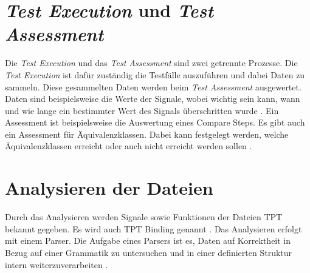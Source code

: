 \section*{\textit{Test Execution} und \textit{Test Assessment}}
Die \textit{Test Execution} und das \textit{Test Assessment} sind zwei getrennte Prozesse.  
Die \textit{Test Execution} ist dafür zuständig die Testfälle auszuführen und dabei Daten zu sammeln. %
Diese gesammelten Daten werden beim \textit{Test Assessment} ausgewertet. 
Daten sind beispielsweise die Werte der Signale, wobei wichtig sein kann, wann und wie lange ein  bestimmter Wert des Signals überschritten wurde \cite[vgl.][S. 1212 ff.]{userguide}.
Ein Assessment ist beispielsweise die Auswertung eines Compare Steps.
Es gibt auch ein Assessment für Äquivalenzklassen. Dabei kann festgelegt werden, welche Äquivalenzklassen erreicht oder auch nicht erreicht werden sollen \cite[vgl.][S. 41 ff.]{tpttutorial}.

\section*{Analysieren der Dateien}
Durch das Analysieren werden Signale sowie Funktionen der Dateien TPT bekannt gegeben. Es wird auch TPT Binding genannt \cite[vgl.][S. 870 ff.]{userguide}.
Das Analysieren erfolgt mit einem Parser. 
Die Aufgabe eines Parsers ist es, Daten auf Korrektheit in Bezug auf einer \glqq Grammatik\grqq{} zu untersuchen und in einer definierten
Struktur intern weiterzuverarbeiten \cite[vgl.][S. 1 ff.]{parser}.

